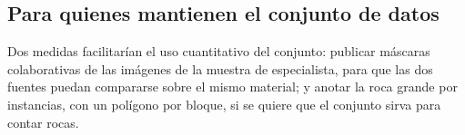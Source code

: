 \subsection{Para quienes mantienen el conjunto de datos}

Dos medidas facilitarían el uso cuantitativo del conjunto: publicar máscaras colaborativas de
las imágenes de la muestra de especialista, para que las dos fuentes puedan compararse sobre el
mismo material; y anotar la roca grande por instancias, con un polígono por bloque, si se quiere
que el conjunto sirva para contar rocas.
